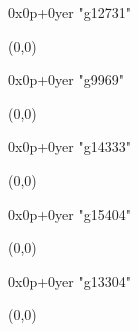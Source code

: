    0x0p+0yer "g12731"
  \begin{textblock}{1}(0,0)
  \end{textblock}

   0x0p+0yer "g9969"
  \begin{textblock}{1}(0,0)
  \end{textblock}

   0x0p+0yer "g14333"
  \begin{textblock}{1}(0,0)
  \end{textblock}

   0x0p+0yer "g15404"
  \begin{textblock}{1}(0,0)
  \end{textblock}

   0x0p+0yer "g13304"
  \begin{textblock}{1}(0,0)
  \end{textblock}
